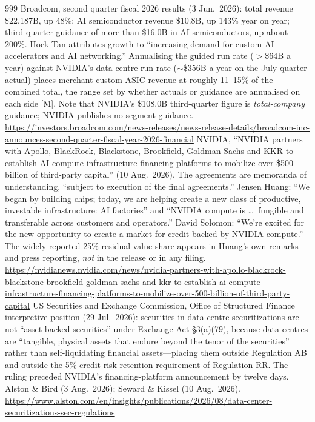 \begin{thebibliography}{999}
 Broadcom, second quarter fiscal 2026 results (3 Jun.\ 2026): total revenue \$22.187B, up 48\%; AI semiconductor revenue \$10.8B, up 143\% year on year; third-quarter guidance of more than \$16.0B in AI semiconductors, up about 200\%. Hock Tan attributes growth to ``increasing demand for custom AI accelerators and AI networking.'' Annualising the guided run rate ($>$\$64B a year) against NVIDIA's data-centre run rate ($\sim$\$356B a year on the July-quarter actual) places merchant custom-ASIC revenue at roughly 11--15\% of the combined total, the range set by whether actuals or guidance are annualised on each side [M]. Note that NVIDIA's \$108.0B third-quarter figure is \emph{total-company} guidance; NVIDIA publishes no segment guidance. \url{https://investors.broadcom.com/news-releases/news-release-details/broadcom-inc-announces-second-quarter-fiscal-year-2026-financial}
 NVIDIA, ``NVIDIA partners with Apollo, BlackRock, Blackstone, Brookfield, Goldman Sachs and KKR to establish AI compute infrastructure financing platforms to mobilize over \$500 billion of third-party capital'' (10 Aug.\ 2026). The agreements are memoranda of understanding, ``subject to execution of the final agreements.'' Jensen Huang: ``We began by building chips; today, we are helping create a new class of productive, investable infrastructure: AI factories'' and ``NVIDIA compute is \ldots\ fungible and transferable across customers and operators.'' David Solomon: ``We're excited for the new opportunity to create a market for credit backed by NVIDIA compute.'' The widely reported 25\% residual-value share appears in Huang's own remarks and press reporting, \emph{not} in the release or in any filing. \url{https://nvidianews.nvidia.com/news/nvidia-partners-with-apollo-blackrock-blackstone-brookfield-goldman-sachs-and-kkr-to-establish-ai-compute-infrastructure-financing-platforms-to-mobilize-over-500-billion-of-third-party-capital}
 US Securities and Exchange Commission, Office of Structured Finance interpretive position (29 Jul.\ 2026): securities in data-centre securitizations are not ``asset-backed securities'' under Exchange Act \S3(a)(79), because data centres are ``tangible, physical assets that endure beyond the tenor of the securities'' rather than self-liquidating financial assets---placing them outside Regulation AB and outside the 5\% credit-risk-retention requirement of Regulation RR. The ruling preceded NVIDIA's financing-platform announcement by twelve days. Alston \& Bird (3 Aug.\ 2026); Seward \& Kissel (10 Aug.\ 2026). \url{https://www.alston.com/en/insights/publications/2026/08/data-center-securitizations-sec-regulations}

\end{thebibliography}
